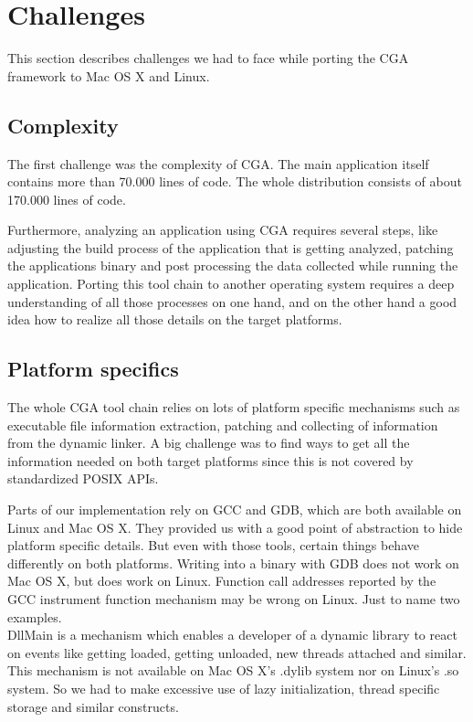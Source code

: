 
\section{Challenges} This section describes challenges we had to face while porting the CGA framework to Mac OS X and Linux.


\subsection{Complexity}

The first challenge was the complexity of CGA. The main application itself contains more than 70.000 lines of code. The whole distribution consists of about 170.000 lines of code.

Furthermore, analyzing an application using CGA requires several steps, like adjusting the build process of the application that is getting analyzed, patching the applications binary and post processing the data collected while running the application. Porting this tool chain to another operating system requires a deep understanding of all those processes on one hand, and on the other hand a good idea how to realize all those details on the target platforms.

\subsection{Platform specifics}

The whole CGA tool chain relies on lots of platform specific mechanisms such as executable file information extraction, patching and collecting of information from the dynamic linker. A big challenge was to find ways to get all the information needed on both target platforms since this is not covered by standardized POSIX APIs.

Parts of our implementation rely on GCC and GDB, which are both available on Linux and Mac OS X. They provided us with a good point of abstraction to hide platform specific details. But even with those tools, certain things behave differently on both platforms. Writing into a binary with GDB does not work on Mac OS X, but does work on Linux. Function call addresses reported by the GCC instrument function mechanism may be wrong on Linux. Just to name two examples.\\ 

DllMain is a mechanism which enables a developer of a dynamic library to react on events like getting loaded, getting unloaded, new threads attached and similar. This mechanism is not available on Mac OS X's .dylib system nor on Linux's .so system. So we had to make excessive use of lazy initialization, thread specific storage and similar constructs.

